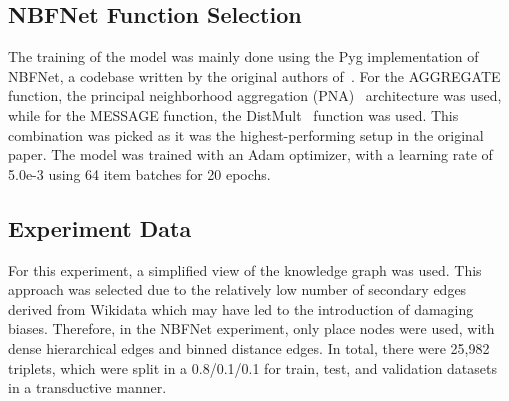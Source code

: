 \subsection{NBFNet Function Selection}

The training of the model was mainly done using the Pyg implementation of NBFNet, a codebase written by the original authors of~\cite{NBFNet_PyG}.
For the AGGREGATE function, the principal neighborhood aggregation (PNA)~\cite{PNA} architecture was used, while for the MESSAGE function, the DistMult~\cite{DistMult} function
was used. This combination was picked as it was the highest-performing setup in the original paper.
The model was trained with an Adam optimizer, with a learning rate of 5.0e-3 using 64 item batches for 20 epochs.

\subsection{Experiment Data}
For this experiment, a simplified view of the knowledge graph was used.
This approach was selected due to the relatively low number of secondary edges derived from Wikidata which may have led to the introduction of damaging biases.
Therefore, in the NBFNet experiment, only place nodes were used, with dense hierarchical edges and binned distance
edges.
In total, there were 25,982 triplets, which were split in a 0.8/0.1/0.1 for train, test, and validation datasets
in a transductive manner.